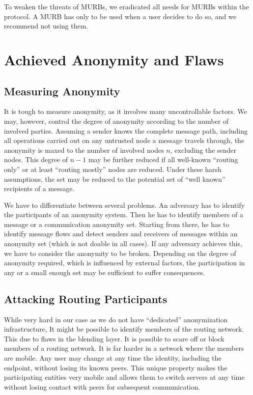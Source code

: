 To weaken the threats of MURBs, we eradicated all needs for MURBs within the protocol. A MURB has only to be used when a user decides to do so, and we recommend not using them.

\section{Achieved Anonymity and Flaws}
\subsection{Measuring Anonymity}
It is tough to measure anonymity, as it involves many uncontrollable factors. We may, however, control the degree of anonymity according to the number of involved parties. Assuming a sender knows the complete message path, including all operations carried out on any untrusted node a message travels through, the anonymity is maxed to the number of involved nodes $n$, excluding the sender nodes. This degree of $n-1$ may be further reduced if all well-known ``routing only'' or at least ``routing mostly'' nodes are reduced. Under these harsh assumptions, the set may be reduced to the potential set of ``well known'' recipients of a message.

We have to differentiate between several problems. An adversary has to identify the participants of an anonymity system. Then he has to identify members of a message or a communication anonymity set. Starting from there, he has to identify message flows and detect senders and receivers of messages within an anonymity set (which is not doable in all cases). If any adversary achieves this, we have to consider the anonymity to be broken. Depending on the degree of anonymity required, which is influenced by external factors, the participation in any or a small enough set may be sufficient to suffer consequences.

\subsection{Attacking Routing Participants}
While very hard in our case as we do not have ``dedicated'' anonymization infrastructure, It might be possible to identify members of the routing network. This due to flaws in the blending layer. It is possible to scare off or block members of a routing network. It is far harder in a network where the members are mobile. Any user may change at any time the identity, including the endpoint, without losing its known peers. This unique property makes the participating entities very mobile and allows them to switch servers at any time without losing contact with peers for subsequent communication.

